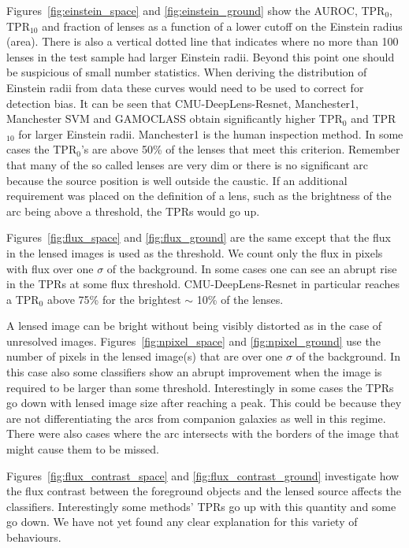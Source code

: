 \documentclass{aa}
\newcommand{\red}[1]{{\color{red} #1}}
\begin{document}
Figures~\ref{fig:einstein_space} and \ref{fig:einstein_ground} show the AUROC, TPR$_0$, TPR$_{10}$ and fraction of lenses as a function of a lower cutoff on the Einstein radius (area).  There is also a vertical dotted line that indicates 
where no more than 100 lenses in the test sample had larger Einstein radii.  Beyond this point one should be suspicious of small number statistics.  When deriving the distribution of Einstein radii from data these curves would need to be used to correct for detection bias.  It can be seen that CMU-DeepLens-Resnet, Manchester1, Manchester SVM and GAMOCLASS obtain significantly higher TPR$_0$ and  TPR$_{10}$ for larger Einstein radii.  Manchester1 is the human inspection method.  In some cases the TPR$_0$'s are above 50\% of the lenses that meet this criterion.  Remember that many of the so called lenses are very dim or there is no significant arc because the source position is well outside the caustic.  If an additional requirement was placed on the definition of a lens, such as the brightness of the arc being above a threshold, the TPRs would go up.

Figures~\ref{fig:flux_space} and \ref{fig:flux_ground} are the same except that the flux in the lensed images is used as the threshold.  We count only the flux in pixels with flux over one $\sigma$ of the background.  In some cases one can see an abrupt rise in the TPRs at some flux threshold.  CMU-DeepLens-Resnet in particular reaches a TPR$_0$ above 75\% for the brightest $\sim$ 10\% of the lenses. %

A lensed image can be bright without being visibly distorted as in the case of unresolved images.  Figures~\ref{fig:npixel_space} and \ref{fig:npixel_ground} use the number of pixels in the lensed image(s) that are over  one $\sigma$ of the background.  In this case also some classifiers show an abrupt improvement when the image is required to be larger than some threshold.  Interestingly in some cases the TPRs go down with lensed image size after reaching a peak.  This could be because they are not differentiating the arcs from companion galaxies as well in this regime.  There were also cases where the arc intersects with the borders of the image that might cause them to be missed.

Figures~\ref{fig:flux_contrast_space} and \ref{fig:flux_contrast_ground} investigate how the flux contrast between the foreground objects and the lensed source affects the classifiers.  Interestingly some methods' TPRs go up with this quantity and some go down.  We have not yet found any clear explanation for this variety of behaviours.  
\end{document}
